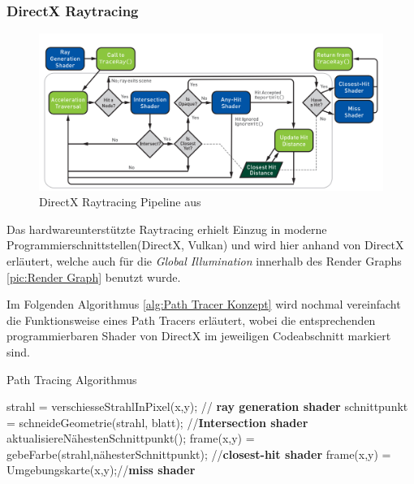 \subsubsection{DirectX Raytracing}

\begin{figure}[H]
    \centering
    \includegraphics[width=\linewidth]{content/PathTracer/Bilder/DirectXRaytracingPipeline.png}
    \caption{DirectX Raytracing Pipeline aus \cite{Haines2019}}
    \label{pic:DirectXRaytracingPipeline}
\end{figure}

Das hardwareunterstützte Raytracing erhielt Einzug in moderne Programmierschnittstellen(DirectX, Vulkan) und wird 
hier anhand von DirectX erläutert, welche auch für die \textit{Global Illumination} innerhalb des 
Render Graphs \ref{pic:Render Graph} benutzt wurde. 

Im Folgenden Algorithmus \ref{alg:Path Tracer Konzept} wird nochmal vereinfacht die Funktionsweise 
eines Path Tracers erläutert, wobei die entsprechenden programmierbaren Shader von DirectX 
im jeweiligen Codeabschnitt markiert sind.

\begin{tcolorbox}
\begin{algorithm}[H]
    \caption{Path Tracing Algorithmus}
    \begin{algorithmic}[1]
        \State strahl = verschiesseStrahlInPixel(x,y); // \textbf{ray generation shader}
        \State schnittpunkt = schneideGeometrie(strahl, blatt); //\textbf{Intersection shader}
        \State aktualisiereNähestenSchnittpunkt();
        \EndIf
        \EndFor
        \State frame(x,y) = gebeFarbe(strahl,nähesterSchnittpunkt); //\textbf{closest-hit shader}
        \Else
        \State frame(x,y) = Umgebungskarte(x,y);//\textbf{miss shader}
        \EndIf
        \EndFor
        \EndProcedure
    \end{algorithmic}
    \label{alg:Path Tracer Konzept}
\end{algorithm}
\end{tcolorbox}

